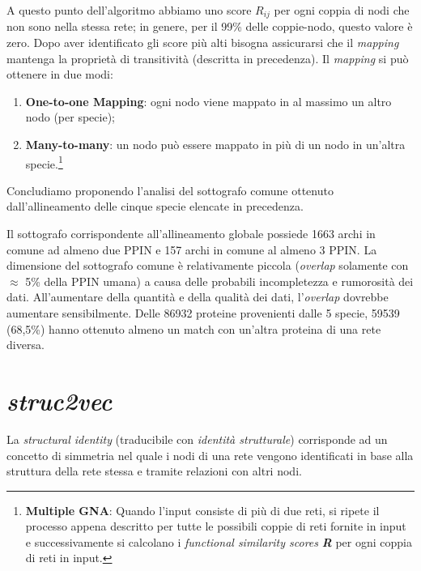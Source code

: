 \documentclass[11pt]{article}
\begin{document}
A questo punto dell'algoritmo abbiamo uno score $R_{ij}$ per ogni coppia di nodi che non sono nella stessa rete; in genere, per il 99\% delle coppie-nodo, questo valore è zero. Dopo aver identificato gli score più alti bisogna assicurarsi che il \textit{mapping} mantenga la proprietà di transitività (descritta in precedenza). Il \textit{mapping} si può ottenere in due modi: 
\begin{enumerate}
\setlength{\itemsep}{1pt}
  \setlength{\parskip}{0pt}
  \setlength{\parsep}{0pt}
\item \textbf{One-to-one Mapping}: ogni nodo viene mappato in al massimo un altro nodo (per specie);
\item \textbf{Many-to-many}: un nodo può essere mappato in più di un nodo in un'altra specie.\footnote{\textbf{Multiple GNA}: Quando l'input consiste di più di due reti, si ripete il processo appena descritto per tutte le possibili coppie di reti fornite in input e successivamente si calcolano i \textit{functional similarity scores} \textit{\textbf{R}} per ogni coppia di reti in input.}
\end{enumerate}

Concludiamo proponendo l'analisi del sottografo comune ottenuto dall'allineamento delle cinque specie elencate in precedenza.

Il sottografo corrispondente all'allineamento globale possiede 1663 archi in comune ad almeno due PPIN e 157 archi in comune al almeno 3 PPIN. La dimensione del sottografo comune è relativamente piccola (\textit{overlap} solamente con $\approx$ 5\% della PPIN umana) a causa delle probabili incompletezza e rumorosità dei dati. All'aumentare della quantità e della qualità dei dati, l'\textit{overlap} dovrebbe aumentare sensibilmente. Delle 86932 proteine provenienti dalle 5 specie, 59539 (68,5\%) hanno ottenuto almeno un match con un'altra proteina di una rete diversa.

\pagebreak
\section{\textit{struc2vec}}
La \textit{structural identity} (traducibile con \textit{identità strutturale}) corrisponde ad un concetto di simmetria nel quale i nodi di una rete vengono identificati in base alla struttura della rete stessa e tramite relazioni con altri nodi. \\
\end{document}
